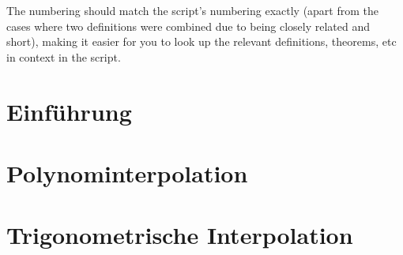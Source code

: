 \documentclass{article}
\begin{document}
The numbering should match the script's numbering exactly (apart from the cases where two definitions were combined due to being closely related and short), making it easier for you to look up the relevant definitions, theorems, etc in context in the script.




\newsection
\section{Einführung}




\newsection
\section{Polynominterpolation}






\newsection
\section{Trigonometrische Interpolation}






\end{document}
